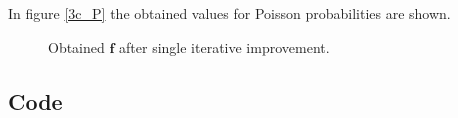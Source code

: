 In figure \ref{3c_P} the obtained values for Poisson probabilities are shown.

\begin{figure}[h!]
  \centering
  
  \caption{Obtained $\mathbf{f}$ after single iterative improvement.}
  \label{fig:3c_P}
\end{figure}

\pagebreak

\subsection*{Code}


\newpage